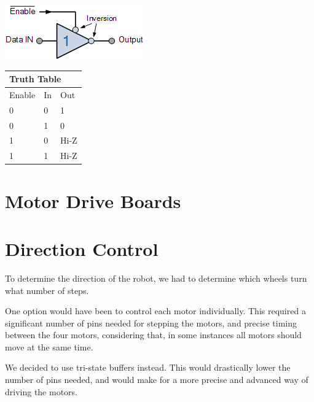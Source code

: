 \begin{minipage}{0.45\textwidth}
	\includegraphics[width=\textwidth]{figures/move/motor53}
\end{minipage}
\hfill
\begin{minipage}{0.45\textwidth}
	\centering
	\begin{tabular}{|l|l|l|}
	\hline
	\multicolumn{3}{|l|}{Truth Table} \\ \hline
	Enable      & In      & Out       \\ \hline
	0           & 0       & 1	      \\ \hline
	0           & 1       & 0	      \\ \hline
	1           & 0       & Hi-Z      \\ \hline
	1           & 1       & Hi-Z      \\ \hline
	\end{tabular}
\end{minipage}

\clearpage
\section{Motor Drive Boards}\label{sec:driver_boards}
\clearpage
\section{Direction Control}\label{sec:direction}
To determine the direction of the robot, we had to determine which wheels turn what number of steps. 

One option would have been to control each motor individually. This required a significant number of pins needed for stepping the motors, and precise timing between the four motors, considering that, in some instances all motors should move at the same time.

We decided to use tri-state buffers instead. This would drastically lower the number of pins needed, and would make for a more precise and advanced way of driving the motors.

